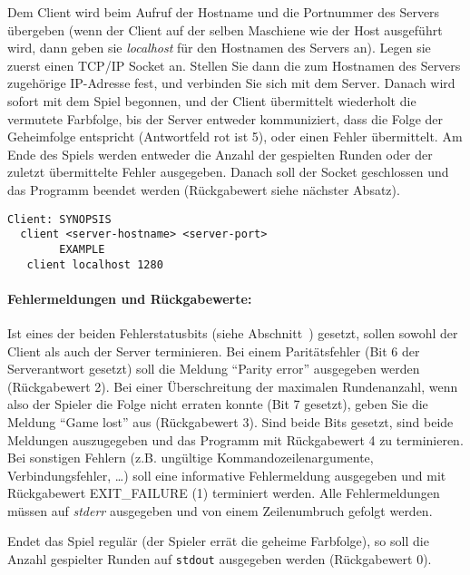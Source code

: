 Dem Client wird beim Aufruf der Hostname und die Portnummer des Servers
übergeben (wenn der Client auf der selben Maschiene wie der Host ausgeführt
wird, dann geben sie \emph{localhost} für den Hostnamen des Servers an). Legen
sie zuerst einen TCP/IP Socket an. Stellen Sie dann die zum Hostnamen des
Servers zugehörige IP-Adresse fest, und verbinden Sie sich mit dem Server.
Danach wird sofort mit dem Spiel begonnen, und der Client übermittelt
wiederholt die vermutete Farbfolge, bis der Server entweder kommuniziert, dass
die Folge der Geheimfolge entspricht (Antwortfeld rot ist 5), oder einen
Fehler übermittelt. Am Ende des Spiels werden entweder die Anzahl der
gespielten Runden oder der zuletzt übermittelte Fehler ausgegeben. Danach soll
der Socket geschlossen und das Programm beendet werden (Rückgabewert siehe
nächster Absatz).

\begin{verbatim}
Client: SYNOPSIS
  client <server-hostname> <server-port>
        EXAMPLE
   client localhost 1280
\end{verbatim}

\paragraph{Fehlermeldungen und Rückgabewerte:} Ist eines der beiden
Fehlerstatusbits (siehe Abschnitt~) gesetzt, sollen sowohl der
Client als auch der Server terminieren. Bei einem Parit\"atsfehler (Bit $6$
der Serverantwort gesetzt) soll die Meldung ``Parity error'' ausgegeben
werden (Rückgabewert 2). Bei einer Überschreitung der maximalen
Rundenanzahl, wenn also der Spieler die Folge nicht erraten konnte (Bit 7
gesetzt), geben Sie die Meldung ``Game lost'' aus (Rückgabewert 3). Sind beide Bits gesetzt, sind beide Meldungen auszugegeben und das
Programm mit Rückgabewert 4 zu terminieren. Bei sonstigen Fehlern (z.B.
ungültige Kommandozeilenargumente, Verbindungsfehler, \ldots) soll eine
informative Fehlermeldung ausgegeben und mit Rückgabewert EXIT\_FAILURE (1)
terminiert werden. Alle Fehlermeldungen müssen auf \emph{stderr} ausgegeben
und von einem Zeilenumbruch gefolgt werden.

Endet das Spiel regulär (der Spieler errät die geheime Farbfolge), so soll die
Anzahl gespielter Runden auf \texttt{stdout} ausgegeben werden (Rückgabewert
0).

